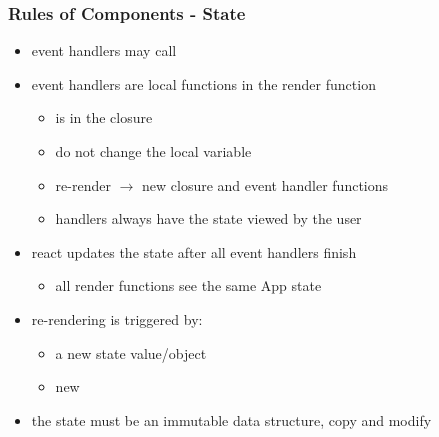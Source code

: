\begin{frame}[fragile] \frametitle{Rules of Components - State}
\begin{itemize}
  \item event handlers may call 
  \item event handlers are local functions in the render function
  \begin{itemize}
    \item {} is in the closure
    \item {} do not change the local variable
    \item re-render $\rightarrow$ new closure and event handler functions
    \item handlers always have the state viewed by the user
  \end{itemize}
  \item react updates the state after all event handlers finish
  \begin{itemize}
    \item all render functions see the same App state
  \end{itemize}
  \item re-rendering is triggered by:
  \begin{itemize}
    \item a new state value/object
    \item new 
  \end{itemize}
  \item the state must be an immutable data structure, copy and modify
\end{itemize}
\end{frame}

